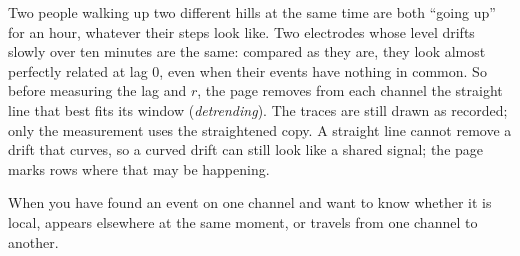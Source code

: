 \begin{plainterms}
Two people walking up two different hills at the same time are both ``going up'' for an hour,
whatever their steps look like. Two electrodes whose level drifts slowly over ten minutes are
the same: compared as they are, they look almost perfectly related at lag 0, even when their
events have nothing in common. So before measuring the lag and $r$, the page removes from
each channel the straight line that best fits its window (\emph{detrending}). The traces are
still drawn as recorded; only the measurement uses the straightened copy. A straight line
cannot remove a drift that curves, so a curved drift can still look like a shared signal; the
page marks rows where that may be happening.
\end{plainterms}

When you have found an event on one channel and want to know whether it is local, appears
elsewhere at the same moment, or travels from one channel to another.


